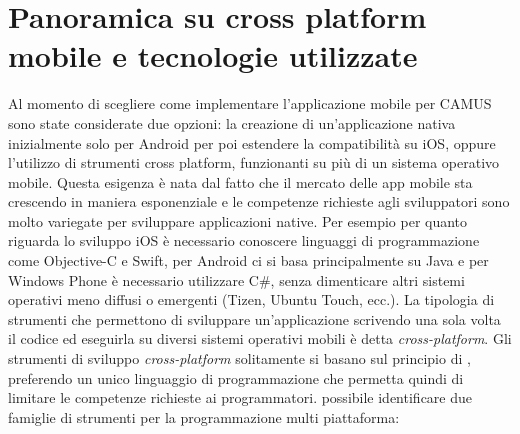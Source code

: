 \section{Panoramica su cross platform mobile e tecnologie utilizzate}\label{sec:panoramica-cross-platform-mobile}
Al momento di scegliere come implementare l'applicazione mobile per CAMUS sono state considerate due opzioni: la creazione di un'applicazione nativa inizialmente solo per Android per poi estendere la compatibilità su iOS, oppure l'utilizzo di strumenti cross platform, funzionanti su più di un sistema operativo mobile.
Questa esigenza è nata dal fatto che il mercato delle app mobile sta crescendo in maniera esponenziale e le competenze richieste agli sviluppatori sono molto variegate per sviluppare applicazioni native.
Per esempio per quanto riguarda lo sviluppo iOS è necessario conoscere linguaggi di programmazione come Objective-C e Swift, per Android ci si basa principalmente su Java e per Windows Phone è necessario utilizzare C\#, senza dimenticare altri sistemi operativi meno diffusi o emergenti (Tizen, Ubuntu Touch, ecc.). La tipologia di strumenti che permettono di sviluppare un'applicazione scrivendo una sola volta il codice ed eseguirla su diversi sistemi operativi mobili è detta \emph{cross-platform}.
Gli strumenti di sviluppo \emph{cross-platform} solitamente si basano sul principio di , preferendo un unico linguaggio di programmazione che permetta quindi di limitare le competenze richieste ai programmatori. 
\upe possibile identificare due famiglie di strumenti per la programmazione multi piattaforma:

